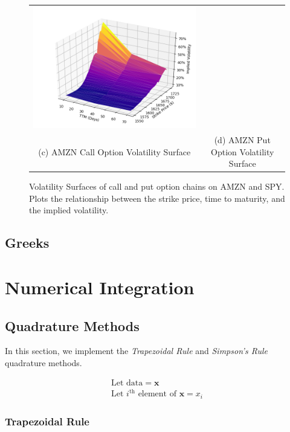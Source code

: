 \documentclass[10pt]{article}
\begin{document}
\begin{figure}
\begin{tabular}{|c|c|}
                \includegraphics[width=.47\textwidth]{bin/vol_surface/AMZN_Put_3DVolSurface.png} \\
                (c) AMZN Call Option Volatility Surface &
                (d) AMZN Put Option Volatility Surface \\
                \hline
            \end{tabular}
            \label{fig:volatility_surfaces}
            \caption{Volatility Surfaces of call and put option chains on AMZN and SPY. Plots the relationship between the strike price, time to maturity, and the implied volatility.}
        \end{figure}

    
    \subsection{Greeks}


\newpage
\section{Numerical Integration}

    \subsection{Quadrature Methods}
    In this section, we implement the \textit{Trapezoidal Rule} and \textit{Simpson's Rule} quadrature methods.

    \begin{gather*}
        \text{Let data} = \boldsymbol{x} \\
        \text{Let $i^\text{th}$ element of $\boldsymbol{x}$} = x_i
    \end{gather*}

        \subsubsection{Trapezoidal Rule}
\end{document}
